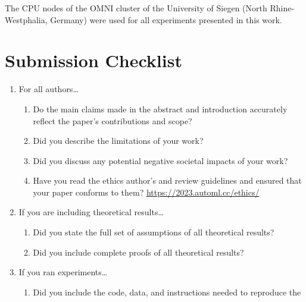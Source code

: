 \documentclass[11pt]{article}
\begin{document}
\newpage
\begin{acknowledgements}
The CPU nodes of the OMNI cluster of the University of Siegen (North Rhine-Westphalia, Germany) were used for all experiments presented in this work.
\end{acknowledgements}

\newpage
\appendix
\section{Submission Checklist}

\begin{enumerate}
\item For all authors\dots
  \begin{enumerate}
  \item Do the main claims made in the abstract and introduction accurately
    reflect the paper's contributions and scope?
  \item Did you describe the limitations of your work?
  \item Did you discuss any potential negative societal impacts of your work?
  \item Have you read the ethics author's and review guidelines and ensured that
    your paper conforms to them? \url{https://2023.automl.cc/ethics/}
  \end{enumerate}
\item If you are including theoretical results\dots
  \begin{enumerate}
  \item Did you state the full set of assumptions of all theoretical results?
  \item Did you include complete proofs of all theoretical results?
  \end{enumerate}
\item If you ran experiments\dots
  \begin{enumerate}
  \item Did you include the code, data, and instructions needed to reproduce the

\end{enumerate}
\end{enumerate}
\end{document}
